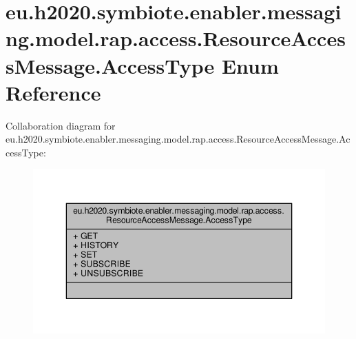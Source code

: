 \hypertarget{enumeu_1_1h2020_1_1symbiote_1_1enabler_1_1messaging_1_1model_1_1rap_1_1access_1_1ResourceAccessMessage_1_1AccessType}{}\section{eu.\+h2020.\+symbiote.\+enabler.\+messaging.\+model.\+rap.\+access.\+Resource\+Access\+Message.\+Access\+Type Enum Reference}
\label{enumeu_1_1h2020_1_1symbiote_1_1enabler_1_1messaging_1_1model_1_1rap_1_1access_1_1ResourceAccessMessage_1_1AccessType}


Collaboration diagram for eu.\+h2020.\+symbiote.\+enabler.\+messaging.\+model.\+rap.\+access.\+Resource\+Access\+Message.\+Access\+Type\+:
\nopagebreak
\begin{figure}[H]
\begin{center}
\leavevmode
\includegraphics[width=346pt]{enumeu_1_1h2020_1_1symbiote_1_1enabler_1_1messaging_1_1model_1_1rap_1_1access_1_1ResourceAccessMc31b34389f4408b728f47e3d728fcc46}
\end{center}
\end{figure}
